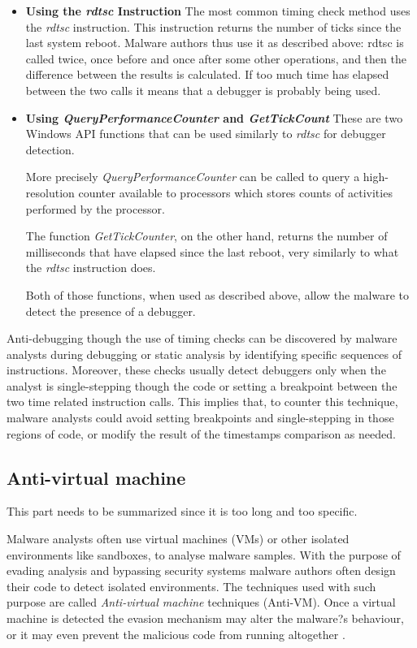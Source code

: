 \documentclass[pdfa%
,cucitura%
]{toptesi}
\begin{document}
\begin{itemize}
	\item \textbf{Using the \textit{rdtsc} Instruction}
	The most common timing check method uses the \textit{rdtsc} instruction. This instruction returns the number of ticks since the last system reboot. Malware authors thus use it as described above: rdtsc is called twice, once before and once after some other operations, and then the difference between the results is calculated. If too much time has elapsed between the two calls it means that a debugger is probably being used.
	
	\item \textbf{Using \textit{QueryPerformanceCounter} and \textit{GetTickCount}}
	These are two Windows API functions that can be used similarly to \textit{rdtsc} for debugger detection.
	
	More precisely \textit{QueryPerformanceCounter} can be called to query a high-resolution counter available to processors which stores counts of activities performed by the processor.
	
	The function \textit{GetTickCounter}, on the other hand, returns the number of milliseconds that have elapsed since the last reboot, very similarly to what the \textit{rdtsc} instruction does.
	
	Both of those functions, when used as described above, allow the malware to detect the presence of a debugger.
\end{itemize}

Anti-debugging though the use of timing checks can be discovered by malware analysts during debugging or static analysis by identifying specific sequences of instructions. Moreover, these checks usually detect debuggers only when the analyst is single-stepping though the code or setting a breakpoint between the two time related instruction calls.
This implies that, to counter this technique, malware analysts could avoid setting breakpoints and single-stepping in those regions of code, or modify the result of the timestamps comparison as needed.

\subsection{Anti-virtual machine}
\color{Green}
This part needs to be summarized since it is too long and too specific.
\color{Black}

Malware analysts often use virtual machines (VMs) or other isolated environments like sandboxes, to analyse malware samples. With the purpose of evading analysis and bypassing security systems malware authors often design their code to detect isolated environments. The techniques used with such purpose are called \textit{Anti-virtual machine} techniques (Anti-VM). Once a virtual machine is detected the evasion mechanism may alter the malware?s behaviour, or it may even prevent the malicious code from running altogether \cite{SikorskiPMA}.
\end{document}

